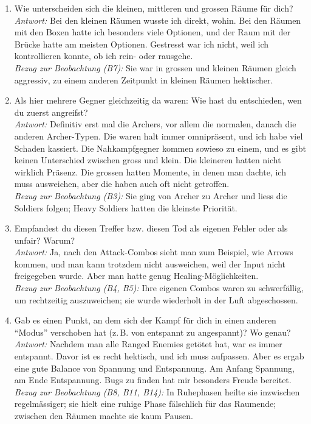\documentclass[../Main.tex]{subfiles}
\begin{document}
\begin{enumerate}[label=\textbf{I\arabic*}, leftmargin=1.5cm, itemsep=1em]
    \item Wie unterscheiden sich die kleinen, mittleren und grossen Räume für dich? \\
    \textit{Antwort:} Bei den kleinen Räumen wusste ich direkt, wohin. Bei den Räumen mit den Boxen hatte ich besonders viele Optionen, und der Raum mit der Brücke hatte am meisten Optionen. Gestresst war ich nicht, weil ich kontrollieren konnte, ob ich rein- oder rausgehe. \\
    \textit{Bezug zur Beobachtung (B7):} Sie war in grossen und kleinen Räumen gleich aggressiv, zu einem anderen Zeitpunkt in kleinen Räumen hektischer.

    \item Als hier mehrere Gegner gleichzeitig da waren: Wie hast du entschieden, wen du zuerst angreifst? \\
    \textit{Antwort:} Definitiv erst mal die Archers, vor allem die normalen, danach die anderen Archer-Typen. Die waren halt immer omnipräsent, und ich habe viel Schaden kassiert. Die Nahkampfgegner kommen sowieso zu einem, und es gibt keinen Unterschied zwischen gross und klein. Die kleineren hatten nicht wirklich Präsenz. Die grossen hatten Momente, in denen man dachte, ich muss ausweichen, aber die haben auch oft nicht getroffen. \\
    \textit{Bezug zur Beobachtung (B3):} Sie ging von Archer zu Archer und liess die Soldiers folgen; Heavy Soldiers hatten die kleinste Priorität.

    \item Empfandest du diesen Treffer bzw. diesen Tod als eigenen Fehler oder als unfair? Warum? \\
    \textit{Antwort:} Ja, nach den Attack-Combos sieht man zum Beispiel, wie Arrows kommen, und man kann trotzdem nicht ausweichen, weil der Input nicht freigegeben wurde. Aber man hatte genug Healing-Möglichkeiten. \\
    \textit{Bezug zur Beobachtung (B4, B5):} Ihre eigenen Combos waren zu schwerfällig, um rechtzeitig auszuweichen; sie wurde wiederholt in der Luft abgeschossen.

    \item Gab es einen Punkt, an dem sich der Kampf für dich in einen anderen \enquote{Modus} verschoben hat (z.\,B. von entspannt zu angespannt)? Wo genau? \\
    \textit{Antwort:} Nachdem man alle Ranged Enemies getötet hat, war es immer entspannt. Davor ist es recht hektisch, und ich muss aufpassen. Aber es ergab eine gute Balance von Spannung und Entspannung. Am Anfang Spannung, am Ende Entspannung. Bugs zu finden hat mir besonders Freude bereitet. \\
    \textit{Bezug zur Beobachtung (B8, B11, B14):} In Ruhephasen heilte sie inzwischen regelmässiger; sie hielt eine ruhige Phase fälschlich für das Raumende; zwischen den Räumen machte sie kaum Pausen.


\end{enumerate}
\end{document}

